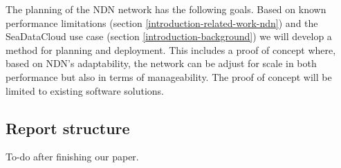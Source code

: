 The planning of the NDN network has the following goals. Based on known performance limitations (section \ref{introduction-related-work-ndn}) and the SeaDataCloud use case (section \ref{introduction-background}) we will develop a method for planning and deployment. This includes a proof of concept where, based on NDN's adaptability, the network can be adjust for scale in both performance but also in terms of manageability. The proof of concept will be limited to existing software solutions.

\subsection{Report structure}
To-do after finishing our paper.


